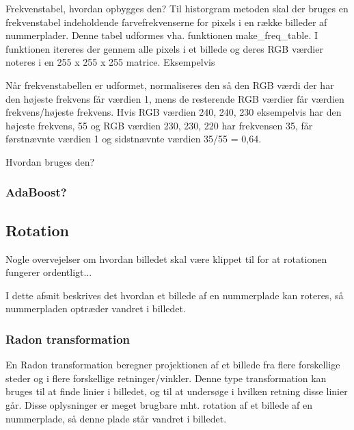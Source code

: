 Frekvenstabel, hvordan opbygges den?
Til historgram metoden skal der bruges en frekvenstabel indeholdende farvefrekvenserne for pixels i en række billeder af nummerplader. Denne tabel udformes vha. funktionen make\_freq\_table. I funktionen itereres der gennem alle pixels i et billede og deres RGB værdier noteres i en 255 x 255 x 255 matrice. Eksempelvis

Når frekvenstabellen er udformet, normaliseres den så den RGB værdi der har den højeste frekvens får værdien 1, mens de resterende RGB værdier får værdien frekvens/højeste frekvens. Hvis RGB værdien 240, 240, 230 eksempelvis har den højeste frekvens, 55 og RGB værdien 230, 230, 220 har frekvensen 35, får førstnævnte værdien 1 og sidstnævnte værdien 35/55 = 0,64.

Hvordan bruges den?



\subsubsection{AdaBoost?}



\subsection{Rotation}

Nogle overvejelser om hvordan billedet skal være klippet til for at rotationen fungerer ordentligt...

I dette afsnit beskrives det hvordan et billede af en nummerplade kan roteres, så nummerpladen optræder vandret i billedet.



\subsubsection{Radon transformation}

En Radon transformation beregner projektionen af et billede fra flere forskellige steder og i flere forskellige retninger/vinkler. Denne type transformation kan bruges til at finde linier i billedet, og til at undersøge i hvilken retning disse linier går. Disse oplysninger er meget brugbare mht. rotation af et billede af en nummerplade, så denne plade står vandret i billedet.

